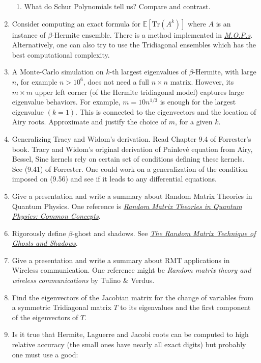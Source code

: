 \documentclass{article}
\begin{document}
\begin{enumerate}
\begin{enumerate}
        \item What do Schur Polynomials tell us? Compare and contrast.
    \end{enumerate}
    \item Consider computing an exact formula for $\mathbb{E}[\text{Tr}(A^k)]$ where $A$ is an instance of $\beta$-Hermite ensemble. There is a method implemented in \href{https://arxiv.org/pdf/math-ph/0409066.pdf}{\emph{\color{blue}M.O.P.s}}. Alternatively, one can also try to use the Tridiagonal ensembles which has the best computational complexity.
    \item A Monte-Carlo simulation on $k$-th largest eigenvalues of $\beta$-Hermite, with large $n$, for example $n>10^6$, does not need a full $n\times n$ matrix. However, its $m\times m$ upper left corner (of the Hermite tridiagonal model) captures large eigenvalue behaviors. For example, $m=10 n^{1/3}$ is enough for the largest eigenvalue $(k=1)$. This is connected to the eigenvectors and the location of Airy roots. Approximate and justify the choice of $m$, for a given $k$. 
    \item Generalizing Tracy and Widom's derivation. Read Chapter 9.4 of Forrester's book. Tracy and Widom's original derivation of Painlev{\'e} equation from Airy, Bessel, Sine kernels rely on certain set of conditions defining these kernels. See (9.41) of Forrester. One could work on a generalization of the condition imposed on (9.56) and see if it leads to any differential equations. 
    \item Give a presentation and write a summary about Random Matrix Theories in Quantum Physics. One reference is \href{http://arxiv.org/abs/cond-mat/9707301}{\emph{\color{blue}Random Matrix Theories in Quantum Physics: Common Concepts}}.
    \item Rigorously define $\beta$-ghost and shadows. See \href{https://math.mit.edu/~edelman/publications/random_matrix_technique.pdf}{\emph{\color{blue}The Random Matrix Technique of Ghosts and Shadows}}. 
    \item Give a presentation and write a summary about RMT applications in Wireless communication. One reference might be \emph{Random matrix theory and wireless communications} by Tulino \& Verdus.
    \item Find the eigenvectors of the Jacobian matrix for the change of variables from a symmetric Tridiagonal matrix $T$ to its eigenvalues and the first component of the eigenvectors of $T$.
    \item Is it true that Hermite, Laguerre and Jacobi roots can be computed to high relative accuracy (the small ones have nearly all exact digits) but probably one must use a good: 

\end{enumerate}
\end{document}
